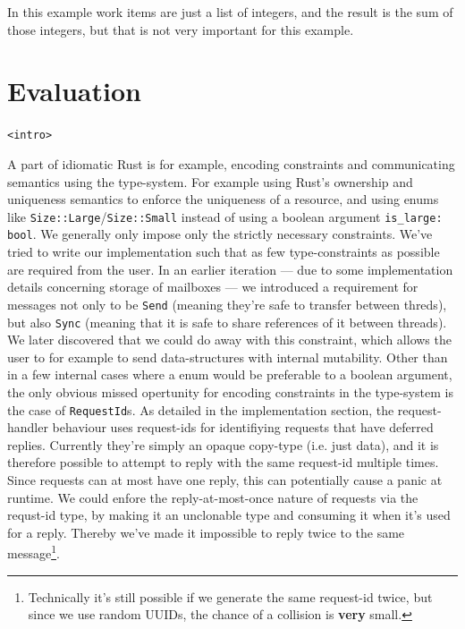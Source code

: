 \documentclass[a4paper]{article}
\begin{document}
\noindent
In this example work items are just a list of integers, and the result is the
sum of those integers, but that is not very important for this example.

%


\section{Evaluation}
{\tt <intro>}

A part of idiomatic Rust is for example, encoding constraints and communicating
semantics using the type-system. For example using Rust's ownership and
uniqueness semantics to enforce the uniqueness of a resource, and using enums
like \texttt{Size::Large}/\texttt{Size::Small} instead of using a boolean
argument \texttt{is\_large: bool}. We generally only impose only the strictly
necessary constraints. We've tried to write our implementation such that as few
type-constraints as possible are required from the user. In an earlier
iteration --- due to some implementation details concerning storage of mailboxes
--- we introduced a requirement for messages not only to be \texttt{Send}
(meaning they're safe to transfer between threds), but also \texttt{Sync}
(meaning that it is safe to share references of it between threads). We later
discovered that we could do away with this constraint, which allows the user to
for example to send data-structures with internal mutability. Other than in a few
internal cases where a enum would be preferable to a boolean argument, the only
obvious missed opertunity for encoding constraints in the type-system is the
case of \texttt{RequestId}s. As detailed in the implementation section, the
request-handler behaviour uses request-ids for identifiying requests that have
deferred replies. Currently they're simply an opaque copy-type (i.e. just data),
and it is therefore possible to attempt to reply with the same request-id
multiple times. Since requests can at most have one reply, this can potentially
cause a panic at runtime. We could enfore the reply-at-most-once nature of
requests via the requst-id type, by making it an unclonable type and consuming
it when it's used for a reply. Thereby we've made it impossible to reply twice
to the same message\footnote{Technically it's still possible if we generate the
  same request-id twice, but since we use random UUIDs, the chance of a
  collision is {\bf very} small.}.
\end{document}
